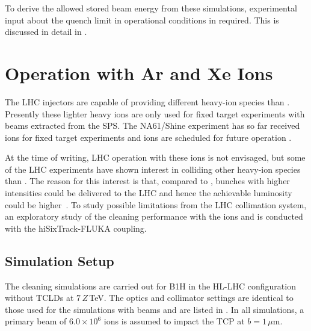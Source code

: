 To derive the allowed stored beam energy from these simulations, experimental input about the quench limit in operational conditions in required. This is discussed in detail in . 


\newpage


\section{Operation with Ar and Xe Ions} \label{chap:xear}

The LHC injectors are capable of providing different heavy-ion species than \lead. Presently these lighter heavy ions are only used for fixed target experiments with beams extracted from the SPS. The NA61/Shine experiment has so far received  ions for fixed target experiments and  ions are scheduled for future operation \cite{IPAC16:TUPMR027,EDMS:1570447,CERN-2014-006}. 

At the time of writing, LHC operation with these ions is not envisaged, but some of the LHC experiments have shown interest in colliding other heavy-ion species than \lead. The reason for this interest is that, compared to \lead, bunches with higher intensities could be delivered to the LHC and hence the achievable luminosity could be higher~\cite{IPAC16:TUPMR027}. To study possible limitations from the LHC collimation system, an exploratory study of the cleaning performance with the ions  and  is conducted with the hiSixTrack-FLUKA coupling.

\subsection{Simulation Setup}

The cleaning simulations are carried out for B1H in the HL-LHC configuration without TCLDs at $7\,Z\,$TeV. The optics and collimator settings are identical to those used for the simulations with \lead beams and are listed in . In all simulations, a primary beam of $6.0 \times 10^6$ ions is assumed to impact the TCP at $b=1\,\mu$m.











